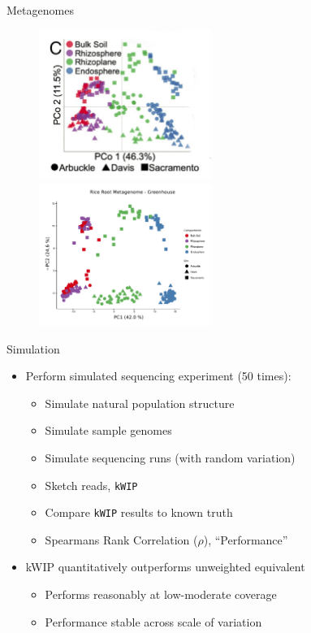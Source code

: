 \documentclass[t]{beamer}
\begin{document}
\begin{frame}{Metagenomes}
  \begin{figure}
    \centering
    \includegraphics[width=0.5\textwidth]{img/greenhouse_edwards.png}
    \includegraphics[width=0.5\textwidth]{img/greenhouse_nw.pdf}
  \end{figure}
\end{frame}

\begin{frame}{Simulation}
  \begin{itemize}
    \item Perform simulated sequencing experiment (50 times):
    \begin{itemize}
      \item Simulate natural population structure
      \item Simulate sample genomes
      \item Simulate sequencing runs (with random variation)
      \item Sketch reads, \texttt{kWIP}
      \item Compare \texttt{kWIP} results to known truth
      \item Spearmans Rank Correlation ($\rho$),  ``Performance''
    \end{itemize}
    \item kWIP quantitatively outperforms unweighted equivalent
      \begin{itemize}
        \item Performs reasonably at low-moderate coverage
        \item Performance stable across scale of variation
      \end{itemize}
  \end{itemize}
\end{frame}
\end{document}
